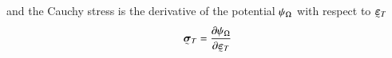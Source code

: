 %
%
%
and the Cauchy stress is the derivative of the potential $\psi_{\Omega{}}$ with respect to $\tensorii{\varepsilon}{}_{\cell}$
%
%
%
\begin{equation}
    \label{eq_stress_ss}
    \begin{aligned}
        \tensorii{\sigma}{}_{\cell} = \frac{\partial \mecPotential_{\bodyLag}}{\partial \tensorii{\varepsilon}{}_{\cell}}
    \end{aligned}
\end{equation}







